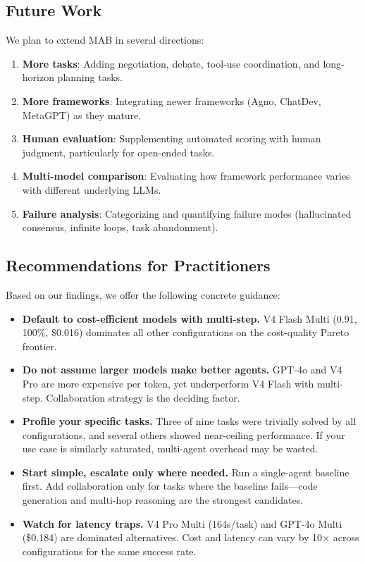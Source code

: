 \documentclass[sigconf,nonacm]{acmart}
\begin{document}
\subsection{Future Work}

We plan to extend MAB in several directions:
\begin{enumerate}
    \item \textbf{More tasks}: Adding negotiation, debate, tool-use coordination, and long-horizon planning tasks.
    \item \textbf{More frameworks}: Integrating newer frameworks (Agno, ChatDev, MetaGPT) as they mature.
    \item \textbf{Human evaluation}: Supplementing automated scoring with human judgment, particularly for open-ended tasks.
    \item \textbf{Multi-model comparison}: Evaluating how framework performance varies with different underlying LLMs.
    \item \textbf{Failure analysis}: Categorizing and quantifying failure modes (hallucinated consensus, infinite loops, task abandonment).
\end{enumerate}

\subsection{Recommendations for Practitioners}

Based on our findings, we offer the following concrete guidance:
\begin{itemize}
    \item \textbf{Default to cost-efficient models with multi-step.} V4 Flash Multi (0.91, 100\%, \$0.016) dominates all other configurations on the cost-quality Pareto frontier.
    \item \textbf{Do not assume larger models make better agents.} GPT-4o and V4 Pro are more expensive per token, yet underperform V4 Flash with multi-step. Collaboration strategy is the deciding factor.
    \item \textbf{Profile your specific tasks.} Three of nine tasks were trivially solved by all configurations, and several others showed near-ceiling performance. If your use case is similarly saturated, multi-agent overhead may be wasted.
    \item \textbf{Start simple, escalate only where needed.} Run a single-agent baseline first. Add collaboration only for tasks where the baseline fails—code generation and multi-hop reasoning are the strongest candidates.
    \item \textbf{Watch for latency traps.} V4 Pro Multi (164s/task) and GPT-4o Multi (\$0.184) are dominated alternatives. Cost and latency can vary by 10$\times$ across configurations for the same success rate.
\end{itemize}
\end{document}
